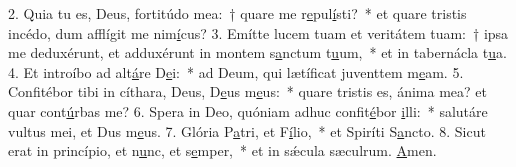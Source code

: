 2. Quia tu es, Deus, fortitúdo mea:~† quare me r\uline{e}pul\uline{í}sti?~* et quare tristis incédo, dum afflígit me nim\uline{í}cus?
3. Emítte lucem tuam et veritátem tuam:~† ipsa me deduxérunt, et adduxérunt in montem s\uline{a}nctum t\uline{u}um,~* et in tabernácla t\uline{u}a.
4. Et introíbo ad alt\uline{á}re D\uline{e}i:~* ad Deum, qui lætíficat juventtem m\uline{e}am.
5. Confitébor tibi in cíthara, Deus, D\uline{e}us m\uline{e}us:~* quare tristis es, ánima mea? et quar cont\uline{ú}rbas me?
6. Spera in Deo, quóniam adhuc confit\uline{é}bor \uline{i}lli:~* salutáre vultus mei, et Dus m\uline{e}us.
7. Glória P\uline{a}tri, et F\uline{í}lio,~* et Spiríti S\uline{a}ncto.
8. Sicut erat in princípio, et n\uline{u}nc, et s\uline{e}mper,~* et in sǽcula sæculrum. \uline{A}men.
